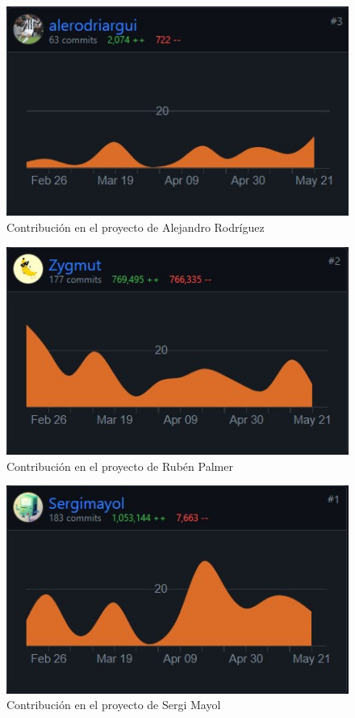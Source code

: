 \begin{figure}[!h]
    \centering
    \includegraphics[width=\linewidth]{alex.png}
    \caption{Contribución en el proyecto de Alejandro Rodríguez}
    \label{fig:contrib_alex}
\end{figure}

\begin{figure}[!h]
    \centering
    \includegraphics[width=\linewidth]{ruben.png}
    \caption{Contribución en el proyecto de Rubén Palmer}
    \label{fig:contrib_ruben}
\end{figure}

\begin{figure}[!h]
    \centering
    \includegraphics[width=\linewidth]{sergi.png}
    \caption{Contribución en el proyecto de Sergi Mayol}
    \label{fig:contrib_sergi}
\end{figure}

